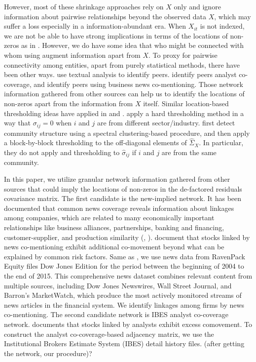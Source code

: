 However, most of these shrinkage approaches rely on ${X}$ only and ignore information about pairwise relationships beyond the observed data ${X}$, which may suffer a loss especially in a information-abundant era. When $X_{it}$ is not indexed, we are not be able to have strong implications in terms of the locations of non-zeros as in \cite{bickel2008regularized}. However, we do have some idea that who might be connected with whom using augment information apart from ${X}$. To proxy for pairwise connectivity among entities, apart from purely statistical methods, there have been other ways. \citet{hoberg2016text} use textual analysis to identify peers. \cite{kaustia2013common} identify peers analyst co-coverage, and \cite{ge2021news} identify peers using business news co-mentioning. Those network information gathered from other sources can help us to identify the locations of non-zeros apart from the information from ${X}$ itself. Similar location-based thresholding ideas have applied in \cite{fan2016incorporating} and \citet{brownlees2020community}. \cite{fan2016incorporating} apply a hard thresholding method in a way that $\sigma_{ij}=0$ when $i$ and $j$ are from different sector/industry. \citet{brownlees2020community} first detect community structure using a spectral clustering-based procedure, and then apply a block-by-block thresholding to the off-diagonal elements of ${\hat{\Sigma}_{X}}$. In particular, they do not apply and thresholding to $\hat{\sigma}_{ij}$ if $i$ and $j$ are from the same community.

In this paper, we utilize granular network information gathered from other sources that could imply the locations of non-zeros in the de-factored residuals covariance matrix. The first candidate is the new-implied network. It has been documented that common news coverage reveals information about linkages among companies, which are related to many economically important relationships like business alliances, partnerships, banking and financing, customer-supplier, and production similarity (\citet{scherbina2015economic}, \citet{schwenkler2019network}). \cite{ge2021news} document that stocks linked by news co-mentioning exhibit additional co-movement beyond what can be explained by common risk factors. Same as \cite{ge2021news}, we use news data from RavenPack Equity files Dow Jones Edition for the period between the beginning of 2004 to the end of 2015. This comprehensive news dataset combines relevant content from multiple sources, including Dow Jones Newswires, Wall Street Journal, and Barron’s  MarketWatch, which produce the most actively monitored streams of news articles in the financial system. We identify linkages among firms by news co-mentioning. The second candidate network is IBES analyst co-coverage network. \cite{israelsen2016does} documents that stocks linked by analysts exhibit excess comovement. To construct the analyst co-coverage-based adjacency matrix, we use the Institutional Brokers Estimate System (IBES) detail history files. (after getting the network, our procedure)?


